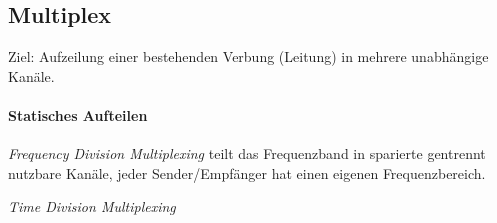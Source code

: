 \documentclass{article}
\begin{document}
\begin{multicols}{1}
\section*{Multiplex}

Ziel: Aufzeilung einer bestehenden Verbung (Leitung) in mehrere unabhängige Kanäle.

\paragraph{Statisches Aufteilen} \emph{Frequency Division Multiplexing} teilt das Frequenzband in sparierte gentrennt nutzbare Kanäle, jeder Sender/Empfänger hat einen eigenen Frequenzbereich.

\emph{Time Division Multiplexing} 

\end{multicols}
\end{document}

